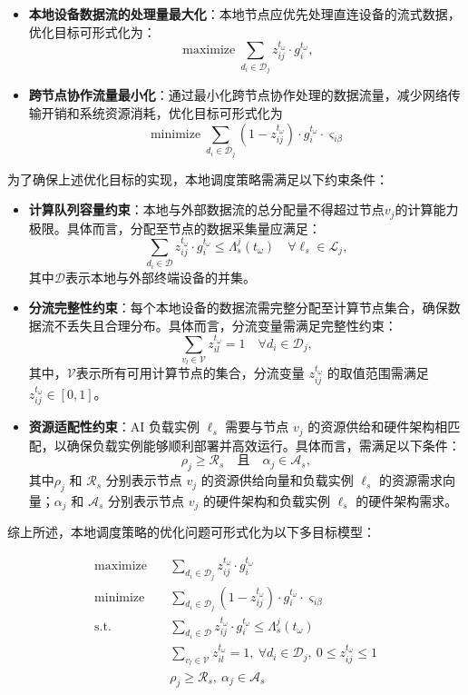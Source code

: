 \begin{itemize}
    \item \textbf{本地设备数据流的处理量最大化}：本地节点应优先处理直连设备的流式数据，优化目标可形式化为：
    \[
    \mathop{\text{maximize}} \sum_{d_i \in \mathcal{D}_{j}} z_{ij}^{t_\omega} \cdot g_i^{t_\omega},
    \]
    \item \textbf{跨节点协作流量最小化}：通过最小化跨节点协作处理的数据流量，减少网络传输开销和系统资源消耗，优化目标可形式化为
    \[
    \mathop{\text{minimize}} \sum_{d_i \in \mathcal{D}_j} (1 - z_{ij}^{t_\omega}) \cdot g_i^{t_\omega} \cdot \varsigma_{i\beta}
    \]
\end{itemize}
为了确保上述优化目标的实现，本地调度策略需满足以下约束条件：

\begin{itemize}
    \item \textbf{计算队列容量约束}：本地与外部数据流的总分配量不得超过节点$v_j$的计算能力极限。具体而言，分配至节点的数据采集量应满足：
    \[
    \sum_{d_i \in \mathcal{D}} z_{ij}^{t_\omega} \cdot g_i^{t_\omega} \leq \Lambda_s^j(t_\omega) \quad \forall \ell_s \in \mathcal{L}_j,
    \]
    其中$\mathcal{D}$表示本地与外部终端设备的并集。
    
    \item \textbf{分流完整性约束}：每个本地设备的数据流需完整分配至计算节点集合，确保数据流不丢失且合理分布。具体而言，分流变量需满足完整性约束：
    \[
    \sum_{v_l \in \mathcal{V}} z_{il}^{t_\omega} = 1 \quad \forall d_i \in \mathcal{D}_j,
    \]
    其中，$\mathcal{V}$表示所有可用计算节点的集合，分流变量 $z_{ij}^{t_\omega}$ 的取值范围需满足 $z_{ij}^{t_\omega} \in [0,1]$。

    \item \textbf{资源适配性约束}：AI 负载实例 $\ell_s$ 需要与节点 $v_j$ 的资源供给和硬件架构相匹配，以确保负载实例能够顺利部署并高效运行。具体而言，需满足以下条件：
    \[
    \rho_j \geq \mathcal{R}_s \quad \text{且} \quad \alpha_j \in \mathcal{A}_s,
    \]
    其中$\rho_j$ 和 $\mathcal{R}_s$ 分别表示节点 $v_j$ 的资源供给向量和负载实例 $\ell_s$ 的资源需求向量；$\alpha_j$ 和 $\mathcal{A}_s$ 分别表示节点 $v_j$ 的硬件架构和负载实例 $\ell_s$ 的硬件架构需求。
\end{itemize}

综上所述，本地调度策略的优化问题可形式化为以下多目标模型：

\[
\begin{aligned}
\mathop{\text{maximize}}\quad & \sum_{d_i \in \mathcal{D}_j} z_{ij}^{t_\omega} \cdot g_i^{t_\omega} \\
\mathop{\text{minimize}}\quad & \sum_{d_i \in \mathcal{D}_j} (1 - z_{ij}^{t_\omega}) \cdot g_i^{t_\omega} \cdot \varsigma_{i\beta} \\
\text{s.t.}\quad 
& \sum_{d_i \in \mathcal{D}} z_{ij}^{t_\omega} \cdot g_i^{t_\omega} \leq \Lambda_s^j(t_\omega) \\
& \sum_{v_l \in \mathcal{V}} z_{il}^{t_\omega} = 1,\ \forall d_i \in \mathcal{D}_j ,\ 0 \leq z_{ij}^{t_\omega} \leq 1\\
& \rho_j \geq \mathcal{R}_s,\ \alpha_j \in \mathcal{A}_s
\end{aligned}
\label{eq:local_scheduling}
\]


